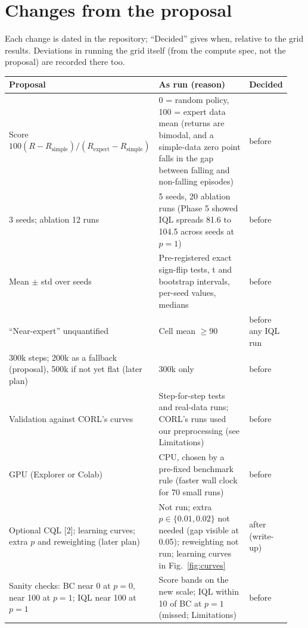 \documentclass{article}
\begin{document}
\section{Changes from the proposal}\label{app:changes}
Each change is dated in the repository; ``Decided'' gives when, relative to the grid results. Deviations in running the grid itself (from the compute spec, not the proposal) are recorded there too.
\begin{center}
  \small
  \begin{tabular}{@{}p{0.31\linewidth}p{0.52\linewidth}p{0.11\linewidth}@{}}
    \toprule
    Proposal & As run (reason) & Decided \\
    \midrule
    Score $100(R-R_\text{simple})/(R_\text{expert}-R_\text{simple})$ & 0 = random policy, 100 = expert data mean (returns are bimodal, and a simple-data zero point falls in the gap between falling and non-falling episodes) & before \\
    3 seeds; ablation 12 runs & 5 seeds, 20 ablation runs (Phase 5 showed IQL spreads 81.6 to 104.5 across seeds at $p=1$) & before \\
    Mean $\pm$ std over seeds & Pre-registered exact sign-flip tests, t and bootstrap intervals, per-seed values, medians & before \\
    ``Near-expert'' unquantified & Cell mean $\geq 90$ & before any IQL run \\
    300k steps; 200k as a fallback (proposal), 500k if not yet flat (later plan) & 300k only & before \\
    Validation against CORL's curves & Step-for-step tests and real-data runs; CORL's runs used our preprocessing (see Limitations) & before \\
    GPU (Explorer or Colab) & CPU, chosen by a pre-fixed benchmark rule (faster wall clock for 70 small runs) & before \\
    Optional CQL [2]; learning curves; extra $p$ and reweighting (later plan) & Not run; extra $p\in\{0.01,0.02\}$ not needed (gap visible at 0.05); reweighting not run; learning curves in Fig.~\ref{fig:curves} & after (write-up) \\
    Sanity checks: BC near 0 at $p=0$, near 100 at $p=1$; IQL near 100 at $p=1$ & Score bands on the new scale; IQL within 10 of BC at $p=1$ (missed; Limitations) & before \\
    \bottomrule
  \end{tabular}
\end{center}
\end{document}
